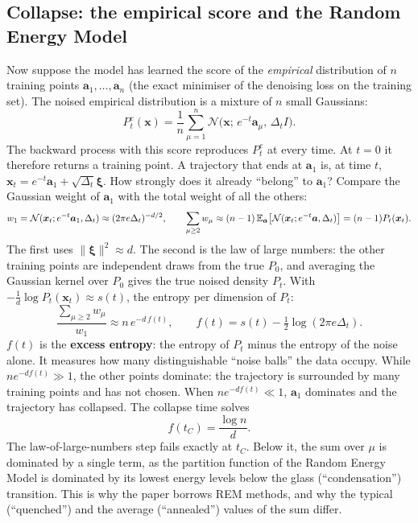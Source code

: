 \subsection{Collapse: the empirical score and the Random Energy Model}\label{sec:dr_gauss_coll}
Now suppose the model has learned the score of the \emph{empirical} distribution of $n$ training points
$\bm a_1,\dots,\bm a_n$ (the exact minimiser of the denoising loss on the training set). The noised empirical
distribution is a mixture of $n$ small Gaussians:
\[
P^e_t(\bm x)=\frac1n\sum_{\mu=1}^n\mathcal N\big(\bm x;\,e^{-t}\bm a_\mu,\,\Delta_tI\big).
\]
The backward process with this score reproduces $P^e_t$ at every time. At $t=0$ it therefore returns a training
point. A trajectory that ends at $\bm a_1$ is, at time $t$, $\bm x_t=e^{-t}\bm a_1+\sqrt{\Delta_t}\bm\xi$. How strongly
does it already ``belong'' to $\bm a_1$? Compare the Gaussian weight of $\bm a_1$ with the total weight of all the
others:
\[
w_1=\mathcal N(\bm x_t;e^{-t}\bm a_1,\Delta_t)\approx(2\pi e\Delta_t)^{-d/2},
\qquad \sum_{\mu\ge2}w_\mu\approx(n-1)\,\mathbb{E}_{\bm a}\big[\mathcal N(\bm x_t;e^{-t}\bm a,\Delta_t)\big]=(n-1)P_t(\bm x_t).
\]
The first uses $\|\bm\xi\|^2\approx d$. The second is the law of large numbers: the other training points are
independent draws from the true $P_0$, and averaging the Gaussian kernel over $P_0$ gives the true noised density
$P_t$. With $-\frac1d\log P_t(\bm x_t)\approx s(t)$, the entropy per dimension of $P_t$:
\begin{equation}\label{eq:collapse_gauss}
\frac{\sum_{\mu\ge2}w_\mu}{w_1}\approx n\,e^{-d\,f(t)},\qquad f(t)=s(t)-\tfrac12\log(2\pi e\Delta_t).
\end{equation}
$f(t)$ is the \textbf{excess entropy}: the entropy of $P_t$ minus the entropy of the noise alone. It measures how many
distinguishable ``noise balls'' the data occupy. While $n e^{-d f(t)}\gg1$, the other points dominate: the trajectory
is surrounded by many training points and has not chosen. When $n e^{-d f(t)}\ll1$, $\bm a_1$ dominates and the
trajectory has collapsed. The collapse time solves
\begin{equation}\label{eq:tc_gauss}
\boxed{f(t_C)=\frac{\log n}{d}.}
\end{equation}
The law-of-large-numbers step fails exactly at $t_C$. Below it, the sum over $\mu$ is dominated by a single term, as
the partition function of the Random Energy Model is dominated by its lowest energy levels below the glass
(``condensation'') transition. This is why the paper borrows REM methods, and why the typical (``quenched'') and the
average (``annealed'') values of the sum differ.


